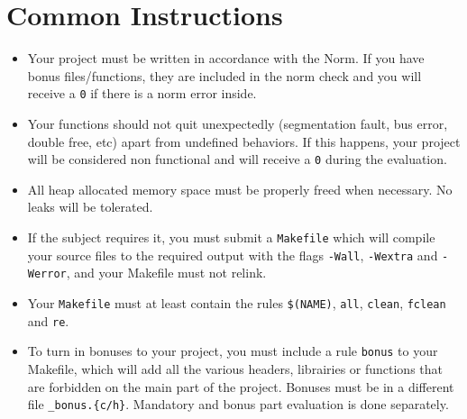 
\chapter{Common Instructions}
    \begin{itemize}

      \item Your project must be written in accordance with the Norm.
        If you have bonus files/functions, they are included in the norm check
        and you will receive a \texttt{0} if there is a norm error inside.

      \item Your functions should not quit unexpectedly (segmentation
        fault, bus error, double free, etc) apart from undefined
        behaviors. If this happens, your project will be considered non
        functional and will receive a \texttt{0} during the evaluation.

      \item All heap allocated memory space must be properly freed
        when necessary. No leaks will be tolerated.

      \item If the subject requires it, you must submit a \texttt{Makefile}
        which will compile your source files to the required output
        with the flags \texttt{-Wall}, \texttt{-Wextra} and \texttt{-Werror},
        and your Makefile must not relink.

      \item Your \texttt{Makefile} must at least contain the rules
        \texttt{\$(NAME)}, \texttt{all}, \texttt{clean},
        \texttt{fclean} and \texttt{re}.

      \item To turn in bonuses to your project, you must include a rule
        \texttt{bonus} to your Makefile, which will add all the various headers, 
        librairies or functions that are forbidden on the main part of the project. 
        Bonuses must be in a different file \texttt{\*\_bonus.\{c/h\}}. Mandatory
        and bonus part evaluation is done separately.


\end{itemize}
